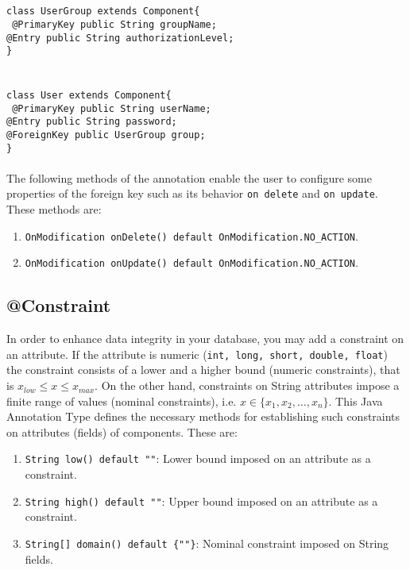 \documentclass[a4paper,10pt]{article}
\begin{document}
\texttt{\\\\class UserGroup extends Component\{\\\label{usergroup}
\hspace*{6}      @PrimaryKey public String groupName;\\
\hspace*{6}      @Entry public String authorizationLevel;\\
\}\\\\\\
class User extends Component\{\\\label{user}
\hspace*{6}   @PrimaryKey public String userName;\\
\hspace*{6}   @Entry public String password;\\
\hspace*{6}   @ForeignKey public UserGroup group;\\ 
\}\\
}\\
The following methods of the annotation enable the user to configure some 
properties of the foreign key such as its behavior \texttt{on delete} and \texttt{on update}.
These methods are:

\begin{enumerate}
	\item \texttt{OnModification onDelete() default OnModification.NO\_ACTION}.
	\item \texttt{OnModification onUpdate() default OnModification.NO\_ACTION}.
\end{enumerate}

\subsection*{@Constraint}\label{constraint}
In order to enhance data integrity in your database, you may add a constraint on an attribute. If
the attribute is numeric (\texttt{int, long, short, double, float}) the constraint consists of a 
lower and a higher bound (numeric constraints), that is $x_{low}\le x \le x_{max}$. On the other hand, constraints on String
attributes impose a finite range of values (nominal constraints), i.e. $x \in \{x_1,x_2,\ldots,x_n \}$. This 
Java Annotation Type defines the necessary methods for establishing such constraints on 
attributes (fields) of components. These are:

\begin{enumerate}
	\item \texttt{String low() default ""}: Lower bound imposed on an attribute as a constraint.
	\item \texttt{String high() default ""}: Upper bound imposed on an attribute as a constraint.
	\item \texttt{String[] domain() default \{""\}}: Nominal constraint imposed on String fields.
\end{enumerate}
\end{document}

